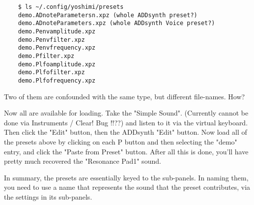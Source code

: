 \begin{verbatim}
	$ ls ~/.config/yoshimi/presets
	demo.ADnoteParametersn.xpz (whole ADDsynth preset?)
	demo.ADnoteParameters.xpz (whole ADDsynth Voice preset?)
	demo.Penvamplitude.xpz
	demo.Penvfilter.xpz
	demo.Penvfrequency.xpz
	demo.Pfilter.xpz
	demo.Plfoamplitude.xpz
	demo.Plfofilter.xpz
	demo.Plfofrequency.xpz
\end{verbatim}

	Two of them are confounded with the same type, but different file-names.
	How?

   Now all are available for loading.  Take the "Simple Sound". 
   (Currently cannot be done via Instruments / Clear! Bug !!??)
   and listen to it via the virtual keyboard.
   Then click the "Edit" button, then the ADDsynth "Edit" button.
   Now load all of the presets above by clicking on each P button and
   then selecting the "demo" entry, and click the "Paste from Preset" button.
   After all this is done, you'll have pretty much recovered the 
   "Resonance Pad1" sound.

   In summary, the presets are essentially keyed to the sub-panels.
   In naming them, you need to use a name that represents the sound that the
   preset contributes, via the settings in its sub-panels.


